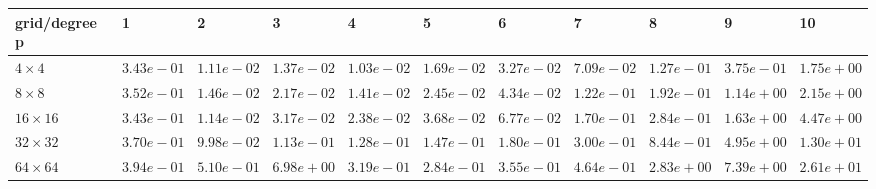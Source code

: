 \begin{tabular}{lllllllllll}
\hline
 grid/degree p   & 1          & 2          & 3          & 4          & 5          & 6          & 7          & 8          & 9          & 10         \\
\hline
 $4 \times 4$    & $3.43e-01$ & $1.11e-02$ & $1.37e-02$ & $1.03e-02$ & $1.69e-02$ & $3.27e-02$ & $7.09e-02$ & $1.27e-01$ & $3.75e-01$ & $1.75e+00$ \\
 $8 \times 8$    & $3.52e-01$ & $1.46e-02$ & $2.17e-02$ & $1.41e-02$ & $2.45e-02$ & $4.34e-02$ & $1.22e-01$ & $1.92e-01$ & $1.14e+00$ & $2.15e+00$ \\
 $16 \times 16$  & $3.43e-01$ & $1.14e-02$ & $3.17e-02$ & $2.38e-02$ & $3.68e-02$ & $6.77e-02$ & $1.70e-01$ & $2.84e-01$ & $1.63e+00$ & $4.47e+00$ \\
 $32 \times 32$  & $3.70e-01$ & $9.98e-02$ & $1.13e-01$ & $1.28e-01$ & $1.47e-01$ & $1.80e-01$ & $3.00e-01$ & $8.44e-01$ & $4.95e+00$ & $1.30e+01$ \\
 $64 \times 64$  & $3.94e-01$ & $5.10e-01$ & $6.98e+00$ & $3.19e-01$ & $2.84e-01$ & $3.55e-01$ & $4.64e-01$ & $2.83e+00$ & $7.39e+00$ & $2.61e+01$ \\
\hline
\end{tabular}